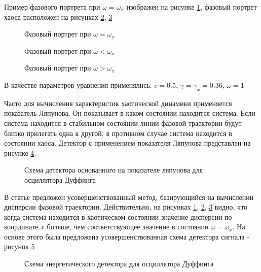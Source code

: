 Пример фазового портрета при ${\omega=\omega_{x}}$ изображен на рисунке \ref{pic:duffing_sync},
фазовый портрет хаоса расположен на рисунках \ref{pic:duffing_chaos1}, \ref{pic:duffing_chaos2}
\begin{figure}[H]
	\center{}
	\caption{Фазовый портрет при ${\omega =\omega_{x}}$}
	\label{pic:duffing_sync}
\end{figure}
\begin{figure}[H]
	\center{}
	\caption{Фазовый портрет при ${\omega < \omega_{x}}$}
	\label{pic:duffing_chaos1}
\end{figure}
\begin{figure}[H]
	\center{}
	\caption{Фазовый портрет при ${\omega > \omega_{x}}$}
	\label{pic:duffing_chaos2}
\end{figure}
В качестве параметров уравнения применялись: $c = 0.5$, $\gamma=\gamma_{x}=0.36$, ${\omega=1}$

Часто для вычисления характеристик хаотической динамики применяется показатель Ляпунова.
Он показывает в каком состоянии находится система. Если система находится
в стабильном состоянии линии фазовой траектории будут близко прилегать одна к другой, в противном
случае система находится в состоянии хаоса. Детектор с применением показателя Ляпунова
представлен на рисунке \ref{pic:chaos_lyapunov}.
\begin{figure}[H]
	\center{}
	\caption{Схема детектора основанного на показателе ляпунова для осциллятора Дуффинга}
	\label{pic:chaos_lyapunov}
\end{figure}

В статье \cite{chaos_chen} предложен усовершенствованный метод, базирующийся на вычислении дисперсии
фазовой траектории. Действительно, на рисунках \ref{pic:duffing_sync}, \ref{pic:duffing_chaos1},
\ref{pic:duffing_chaos2} видно, что когда система находится в хаотическом состоянии значение
дисперсии по координате ${x}$ больше, чем соответствующее значение в состоянии $\omega = \omega_{x}$.
На основе этого была предложена усовершенствованная схема детектора сигнала - рисунок \ref{pic:chaos_energy_detector}
\begin{figure}[H]
	\center{}
	\caption{Схема энергетического детектора для осциллятора Дуффинга}
	\label{pic:chaos_energy_detector}
\end{figure}

